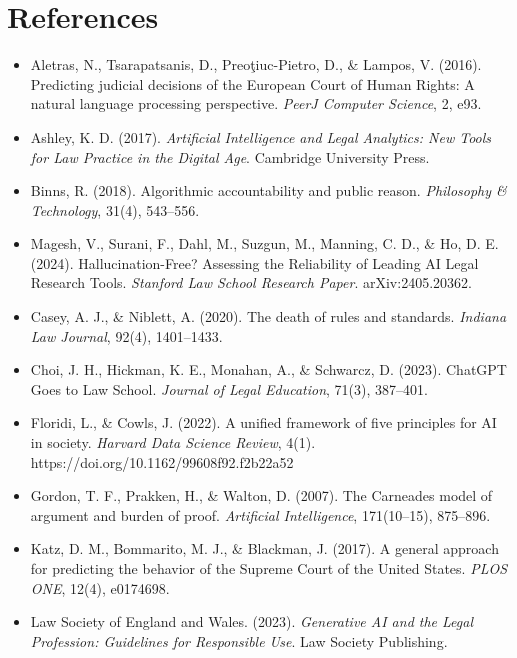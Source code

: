 \documentclass[12pt,a4paper]{article}
\begin{document}
\section*{References}
\begin{itemize}[leftmargin=*]
    \item Aletras, N., Tsarapatsanis, D., Preoţiuc-Pietro, D., \& Lampos, V. (2016). Predicting judicial decisions of the European Court of Human Rights: A natural language processing perspective. \textit{PeerJ Computer Science}, 2, e93.

    \item Ashley, K. D. (2017). \textit{Artificial Intelligence and Legal Analytics: New Tools for Law Practice in the Digital Age}. Cambridge University Press.

    \item Binns, R. (2018). Algorithmic accountability and public reason. \textit{Philosophy \& Technology}, 31(4), 543–556.

    \item Magesh, V., Surani, F., Dahl, M., Suzgun, M., Manning, C. D., \& Ho, D. E. (2024). Hallucination-Free? Assessing the Reliability of Leading AI Legal Research Tools. \textit{Stanford Law School Research Paper}. arXiv:2405.20362.

    \item Casey, A. J., \& Niblett, A. (2020). The death of rules and standards. \textit{Indiana Law Journal}, 92(4), 1401–1433.

    \item Choi, J. H., Hickman, K. E., Monahan, A., \& Schwarcz, D. (2023). ChatGPT Goes to Law School. \textit{Journal of Legal Education}, 71(3), 387–401.

    \item Floridi, L., \& Cowls, J. (2022). A unified framework of five principles for AI in society. \textit{Harvard Data Science Review}, 4(1). https://doi.org/10.1162/99608f92.f2b22a52

    \item Gordon, T. F., Prakken, H., \& Walton, D. (2007). The Carneades model of argument and burden of proof. \textit{Artificial Intelligence}, 171(10–15), 875–896.

    \item Katz, D. M., Bommarito, M. J., \& Blackman, J. (2017). A general approach for predicting the behavior of the Supreme Court of the United States. \textit{PLOS ONE}, 12(4), e0174698.

    \item Law Society of England and Wales. (2023). \textit{Generative AI and the Legal Profession: Guidelines for Responsible Use}. Law Society Publishing.


\end{itemize}
\end{document}
